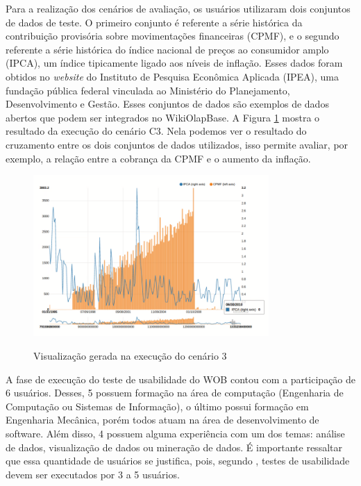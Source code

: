 Para a realização dos cenários de avaliação, os usuários utilizaram dois conjuntos de dados de teste.
O primeiro conjunto é referente a série histórica da contribuição provisória sobre movimentações
financeiras (CPMF), e o segundo referente a série histórica do índice nacional de preços ao
consumidor amplo (IPCA), um índice tipicamente ligado aos níveis de inflação. 
Esses dados foram obtidos no \textit{website} do Instituto de Pesquisa Econômica Aplicada 
(IPEA), uma fundação pública federal vinculada ao Ministério do Planejamento, Desenvolvimento e 
Gestão. Esses conjuntos de dados são exemplos de dados abertos que podem ser integrados no 
WikiOlapBase. A Figura \ref{fig:visualizacao} mostra o resultado da execução do cenário C3. 
Nela podemos ver o resultado do cruzamento entre os dois conjuntos de dados utilizados, isso 
permite avaliar, por exemplo, a relação entre a cobrança da CPMF e o aumento da inflação.

\begin{figure}[!htb]
    \centering
    \caption{Visualização gerada na execução do cenário 3}
    \includegraphics[width=0.8\textwidth]{./04-figuras/visualizacao}
    \label{fig:visualizacao}
\end{figure}

A fase de execução do teste de usabilidade do WOB contou com a participação de 6 usuários. 
Desses, 5 possuem formação na área de computação (Engenharia de Computação ou Sistemas de 
Informação), o último possui formação em Engenharia Mecânica, porém todos atuam na área de 
desenvolvimento de software. Além disso, 4 possuem alguma experiência com um dos temas: 
análise de dados, visualização de dados ou mineração de dados. É importante ressaltar que
essa quantidade de usuários se justifica, pois, segundo , testes de 
usabilidade devem ser executados por 3 a 5 usuários.

